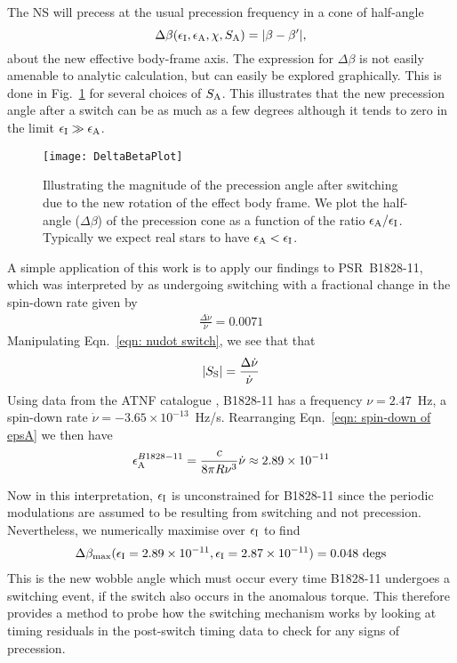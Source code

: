 \documentclass[../full_thesis/full_thesis.tex]{subfiles}
\begin{document}
The NS will precess at the usual precession frequency in a cone  of half-angle
\begin{equation}
    \Delta\beta(\epsilon_{\mathrm{I}}, \epsilon_{\mathrm{A}}, \chi, S_{\mathrm{A}})=|\beta - \beta'|,
\end{equation}
about the new effective body-frame axis.  The expression for $\Delta \beta$ is
not easily amenable to analytic calculation, but can easily be explored
graphically.  This is done in Fig.~\ref{fig: DeltaBetaPlot} for several choices
of $S_{\mathrm{A}}$. This illustrates that the new precession angle after a switch can be
as much as a few degrees although it tends to zero in the limit $\epsilon_{\mathrm{I}} \gg
\epsilon_{\mathrm{A}}$.
\begin{figure}[htb]
    \centering
    \texttt{[image: DeltaBetaPlot]}
    \caption{Illustrating the magnitude of the precession angle after switching
        due to the new rotation of the effect body frame. We plot the half-angle
        ($\Delta\beta$) of the precession cone as a function of the ratio
    $\epsilon_{\mathrm{A}}/\epsilon_{\mathrm{I}}$. Typically we expect real stars to have $\epsilon_{\mathrm{A}} < \epsilon_{\mathrm{I}}$.}
    \label{fig: DeltaBetaPlot}
\end{figure}

A simple application of this work is to apply our findings to PSR~B1828-11,
which was interpreted by \citet{Lyne2010} as undergoing switching with a fractional
change in the spin-down rate given by
\begin{align}
\frac{\Delta\dot{\nu}}{\dot{\nu}} = 0.0071
\end{align}
Manipulating Eqn.~\eqref{eqn: nudot switch}, we see that that
\begin{align}
|S_{\mathrm{S}}| = \frac{\Delta\dot{\nu}}{\dot{\nu}}
\end{align}
Using data from the ATNF catalogue \citep{ATNF}, B1828-11 has a frequency
$\nu = 2.47$~Hz, a spin-down rate $\dot{\nu}=-3.65\times10^{-13}$~Hz/s.
Rearranging Eqn.~\ref{eqn: spin-down of epsA} we then have
\begin{align}
\epsilon_{\mathrm{A}}^{B1828-11} = \frac{c}{8\pi R\nu^{3}}\dot{\nu} \approx 2.89 \times 10^{-11}
\end{align}

Now in this interpretation, $\epsilon_{\mathrm{I}}$ is unconstrained for B1828-11 since the
periodic modulations are assumed to be resulting from switching and not
precession. Nevertheless, we numerically maximise over $\epsilon_{\mathrm{I}}$ to find
\begin{align}
\Delta\beta_{\textrm{max}}(\epsilon_{\mathrm{I}}=2.89\times10^{-11}, \epsilon_{\mathrm{I}}=2.87\times10^{-11})
= 0.048 \textrm{ degs}
\end{align}
This is the new wobble angle which must occur every time B1828-11 undergoes a
switching event, if the switch also occurs in the anomalous torque. This
therefore provides a method to probe how the switching mechanism works by
looking at timing residuals in the post-switch timing data to check for
any signs of precession.
\end{document}
